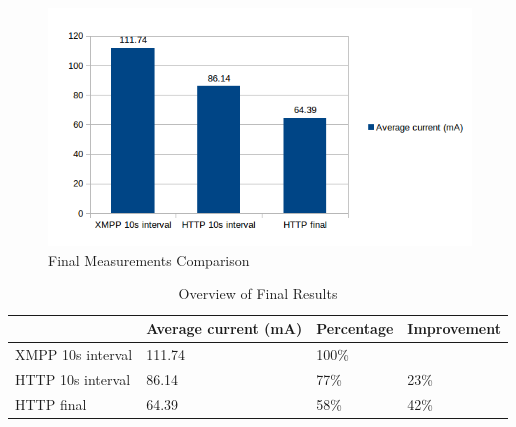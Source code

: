\begin{figure}[h!]
\centering
\includegraphics[scale=1]{4/figures/final_measurements.png}
\caption{Final Measurements Comparison}
\label{final_measurements}
\end{figure}

\begin{table}[h]
\centering
  \begin{tabular}{|l|l|l|l|}
    \hline
     & Average current (mA) & Percentage & Improvement \\ \hline
    XMPP 10s interval & 111.74 & 100\% & \\ \hline
    HTTP 10s interval & 86.14 & 77\% & 23\% \\ \hline
    HTTP final & 64.39 & 58\% & 42\% \\
    \hline
  \end{tabular}
\caption{Overview of Final Results}
\label{table}
\end{table}

\\
\\

